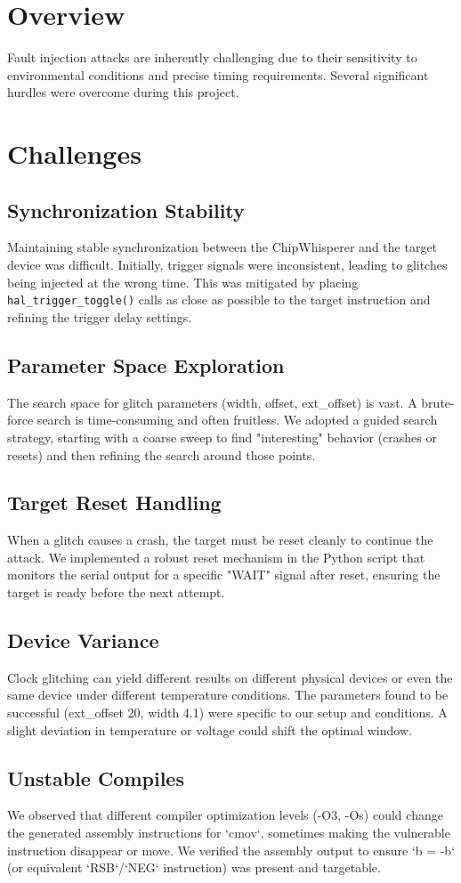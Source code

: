 \section{Overview}
Fault injection attacks are inherently challenging due to their sensitivity to environmental conditions and precise timing requirements. Several significant hurdles were overcome during this project.

\section{Challenges}

\subsection{Synchronization Stability}
Maintaining stable synchronization between the ChipWhisperer and the target device was difficult. Initially, trigger signals were inconsistent, leading to glitches being injected at the wrong time. This was mitigated by placing \texttt{hal\_trigger\_toggle()} calls as close as possible to the target instruction and refining the trigger delay settings.

\subsection{Parameter Space Exploration}
The search space for glitch parameters (width, offset, ext\_offset) is vast. A brute-force search is time-consuming and often fruitless. We adopted a guided search strategy, starting with a coarse sweep to find "interesting" behavior (crashes or resets) and then refining the search around those points.

\subsection{Target Reset Handling}
When a glitch causes a crash, the target must be reset cleanly to continue the attack. We implemented a robust reset mechanism in the Python script that monitors the serial output for a specific "WAIT" signal after reset, ensuring the target is ready before the next attempt.

\subsection{Device Variance}
Clock glitching can yield different results on different physical devices or even the same device under different temperature conditions. The parameters found to be successful (ext\_offset 20, width 4.1) were specific to our setup and conditions. A slight deviation in temperature or voltage could shift the optimal window.

\subsection{Unstable Compiles}
We observed that different compiler optimization levels (-O3, -Os) could change the generated assembly instructions for `cmov`, sometimes making the vulnerable instruction disappear or move. We verified the assembly output to ensure `b = -b` (or equivalent `RSB`/`NEG` instruction) was present and targetable.
